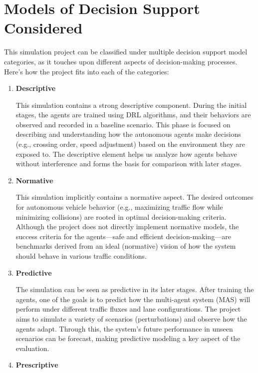 \section{Models of Decision Support Considered}

This simulation project can be classified under multiple decision support model categories, as it touches upon different aspects of decision-making processes. Here's how the project fits into each of the categories:

\begin{enumerate}
    \item \textbf{Descriptive}

      This simulation contains a strong descriptive component.    
      During the initial stages, the agents are trained using DRL algorithms, and their behaviors are observed and recorded in a baseline scenario. This phase is focused on describing and understanding how the autonomous agents make decisions (e.g., crossing order, speed adjustment) based on the environment they are exposed to. The descriptive element helps us analyze how agents behave without interference and forms the basis for comparison with later stages.
      
    \item \textbf{Normative}

          This simulation implicitly contains a normative aspect.
      The desired outcomes for autonomous vehicle behavior (e.g., maximizing traffic flow while minimizing collisions) are rooted in optimal decision-making criteria. Although the project does not directly implement normative models, the success criteria for the agents—safe and efficient decision-making—are benchmarks derived from an ideal (normative) vision of how the system should behave in various traffic conditions.
      
    \item \textbf{Predictive}

          The simulation can be seen as predictive in its later stages.
      After training the agents, one of the goals is to predict how the multi-agent system (MAS) will perform under different traffic fluxes and lane configurations. The project aims to simulate a variety of scenarios (perturbations) and observe how the agents adapt. Through this, the system’s future performance in unseen scenarios can be forecast, making predictive modeling a key aspect of the evaluation.
      
    \item \textbf{Prescriptive}


\end{enumerate}
